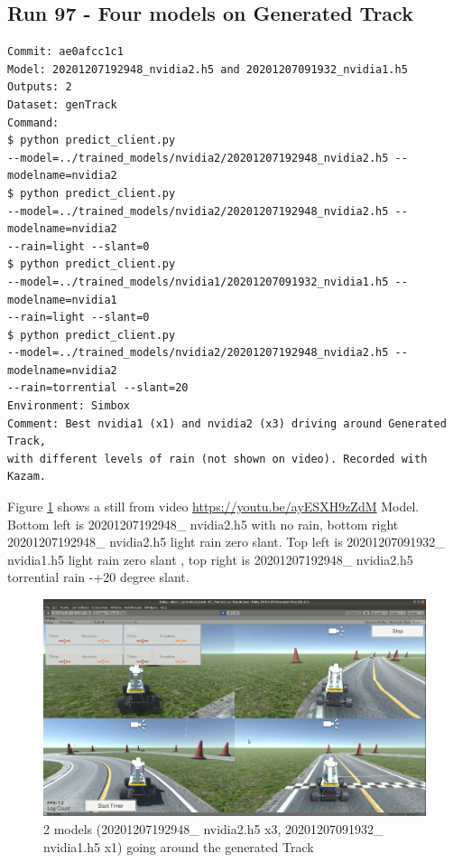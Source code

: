 \subsection{Run 97 - Four models on Generated Track }
\label{app_res:97}
\begin{verbatim}
Commit: ae0afcc1c1
Model: 20201207192948_nvidia2.h5 and 20201207091932_nvidia1.h5
Outputs: 2
Dataset: genTrack
Command:
$ python predict_client.py
--model=../trained_models/nvidia2/20201207192948_nvidia2.h5 --modelname=nvidia2
$ python predict_client.py
--model=../trained_models/nvidia2/20201207192948_nvidia2.h5 --modelname=nvidia2 
--rain=light --slant=0
$ python predict_client.py
--model=../trained_models/nvidia1/20201207091932_nvidia1.h5 --modelname=nvidia1
--rain=light --slant=0
$ python predict_client.py
--model=../trained_models/nvidia2/20201207192948_nvidia2.h5 --modelname=nvidia2
--rain=torrential --slant=20
Environment: Simbox
Comment: Best nvidia1 (x1) and nvidia2 (x3) driving around Generated Track,
with different levels of rain (not shown on video). Recorded with Kazam.
\end{verbatim}
Figure  \ref{fig:2948x3_1932x1_genTrack}  shows a still from video \url{https://youtu.be/ayESXH9zZdM} Model.
Bottom left is 20201207192948\_ nvidia2.h5 with no rain, bottom right 20201207192948\_ nvidia2.h5 light rain zero slant. Top left is 20201207091932\_ nvidia1.h5 light rain zero slant , top right is 20201207192948\_ nvidia2.h5 torrential rain -+20 degree slant.

\begin{figure}[ht]
 \centering 
 \includegraphics[width=\textwidth]{Figures/2948x3_1932x1_genTrack.png}
 \caption{2 models (20201207192948\_ nvidia2.h5 x3, 20201207091932\_ nvidia1.h5 x1) going around the generated Track}
 \label{fig:2948x3_1932x1_genTrack} 
\end{figure}

